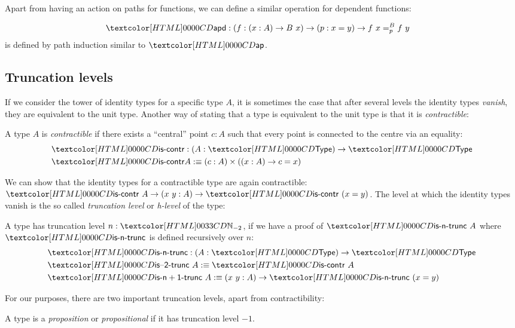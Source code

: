 Apart from having an action on paths for functions, we can define a
similar operation for dependent functions:

\begin{definition}
  \begin{align*}
    &\apd : (f : (x : A) \to B\ x) \to (p : x = y) \to \pathover{B}{p}{f\ x}{f\ y}
  \end{align*}
  is defined by path induction similar to $\ap$.
\end{definition}

\subsection{Truncation levels}

If we consider the tower of identity types for a specific type $A$, it
is sometimes the case that after several levels the identity types
\emph{vanish}, \ie they are equivalent to the unit type. Another way
of stating that a type is equivalent to the unit type is that it is
\emph{contractible}:

\begin{definition}
  A type $A$ is \emph{contractible} if there exists a ``central''
  point $c : A$ such that every point is connected to the centre via
  an equality:
  \begin{align*}
    &\iscontr : (A : \Type) \to \Type \\
    &\iscontr A \ddefeq (c : A) \times ((x : A) \to c = x)
  \end{align*}
\end{definition}

We can show that the identity types for a contractible type are again
contractible: $\iscontr\ A \to (x\ y : A) \to \iscontr\ (x = y)$. The
level at which the identity types vanish is the so called
\emph{truncation level} or \emph{h-level} of the type:
\begin{definition}
  A type has truncation level $n : \natty_{-2}$, if we have a proof of
  $\istrunc{n}\ A$ where $\istrunc{n}$ is defined recursively over $n$:
  \begin{align*}
    &\istrunc{n} : (A : \Type) \to \Type \\
    &\istrunc{-2}\ A \ddefeq \iscontr\ A \\
    &\istrunc{n+1}\ A \ddefeq (x\ y : A) \to \istrunc{n}\ (x = y)
  \end{align*}
\end{definition}

For our purposes, there are two important truncation levels, apart
from contractibility:
\begin{definition}
  A type is a \emph{proposition} or \emph{propositional} if it has
  truncation level $-1$.
\end{definition}

